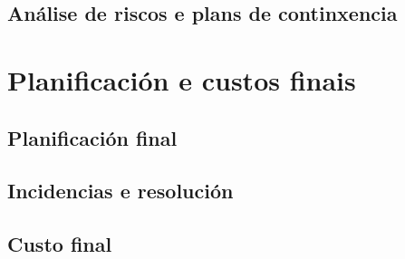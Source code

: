
\subsection{Análise de riscos e plans de continxencia}


\section{Planificación e custos finais}
\subsection{Planificación final}
\subsection{Incidencias e resolución}
\subsection{Custo final}

